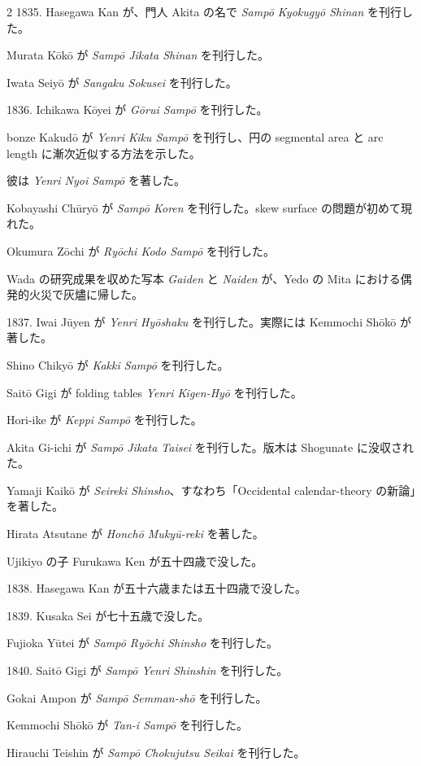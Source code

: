 \documentclass[11pt]{article}
\newcommand{\scanpage}[2]{\clearpage\setcounter{footnote}{0}\noindent{\footnotesize\color{gray}PDF #1 頁 · #2}\par\medskip}
\begin{document}
\scanpage{0203}{第23章年表、印刷頁189}
\begin{multicols}{2}\small
1835. Hasegawa Kan が、門人 Akita の名で \emph{Sampō Kyokugyō Shinan} を刊行した。

Murata Kōkō が \emph{Sampō Jikata Shinan} を刊行した。

Iwata Seiyō が \emph{Sangaku Sokusei} を刊行した。

1836. Ichikawa Kōyei が \emph{Gōrui Sampō} を刊行した。

bonze Kakudō が \emph{Yenri Kiku Sampō} を刊行し、円の segmental area と arc length に漸次近似する方法を示した。

彼は \emph{Yenri Nyoi Sampō} を著した。

Kobayashi Chūryō が \emph{Sampō Koren} を刊行した。skew surface の問題が初めて現れた。

Okumura Zōchi が \emph{Ryōchi Kodo Sampō} を刊行した。

Wada の研究成果を収めた写本 \emph{Gaiden} と \emph{Naiden} が、Yedo の Mita における偶発的火災で灰燼に帰した。

1837. Iwai Jūyen が \emph{Yenri Hyōshaku} を刊行した。実際には Kemmochi Shōkō が著した。

Shino Chikyō が \emph{Kakki Sampō} を刊行した。

Saitō Gigi が folding tables \emph{Yenri Kigen-Hyō} を刊行した。

Hori-ike が \emph{Keppi Sampō} を刊行した。

Akita Gi-ichi が \emph{Sampō Jikata Taisei} を刊行した。版木は Shogunate に没収された。

Yamaji Kaikō が \emph{Seireki Shinsho}、すなわち「Occidental calendar-theory の新論」を著した。

Hirata Atsutane が \emph{Honchō Mukyū-reki} を著した。

Ujikiyo の子 Furukawa Ken が五十四歳で没した。

1838. Hasegawa Kan が五十六歳または五十四歳で没した。

1839. Kusaka Sei が七十五歳で没した。

Fujioka Yūtei が \emph{Sampō Ryōchi Shinsho} を刊行した。

1840. Saitō Gigi が \emph{Sampō Yenri Shinshin} を刊行した。

Gokai Ampon が \emph{Sampō Semman-shō} を刊行した。

Kemmochi Shōkō が \emph{Tan-i Sampō} を刊行した。

\columnbreak
Hirauchi Teishin が \emph{Sampō Chokujutsu Seikai} を刊行した。


\end{multicols}
\end{document}
